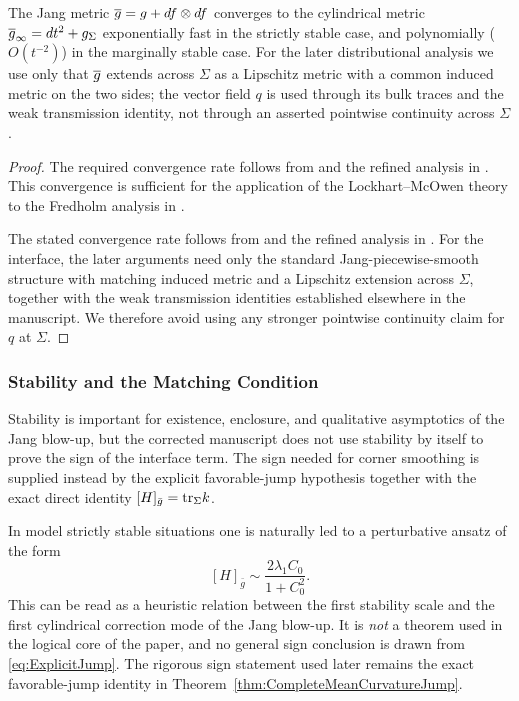 \begin{corollary}\label{cor:MetricAsymptotics}
The Jang metric $\overline{g} = g + df \otimes df$ converges to the cylindrical metric $\overline{g}_{\infty} = dt^2 + g_\Sigma$ exponentially fast in the strictly stable case, and polynomially ($O(t^{-2})$) in the marginally stable case. For the later distributional analysis we use only that $\overline{g}$ extends across $\Sigma$ as a Lipschitz metric with a common induced metric on the two sides; the vector field $q$ is used through its bulk traces and the weak transmission identity, not through an asserted pointwise continuity across $\Sigma$.
\end{corollary}
\begin{proof}
The required convergence rate follows from  and the refined analysis in . This convergence is sufficient for the application of the Lockhart--McOwen theory \cite{lockhartmccowen1985} to the Fredholm analysis in .

The stated convergence rate follows from  and the refined analysis in . For the interface, the later arguments need only the standard Jang-piecewise-smooth structure with matching induced metric and a Lipschitz extension across $\Sigma$, together with the weak transmission identities established elsewhere in the manuscript. We therefore avoid using any stronger pointwise continuity claim for $q$ at $\Sigma$.
\end{proof}

\subsubsection{Stability and the Matching Condition}
Stability is important for existence, enclosure, and qualitative asymptotics of the Jang blow-up, but the corrected manuscript does not use stability by itself to prove the sign of the interface term. The sign needed for corner smoothing is supplied instead by the explicit favorable-jump hypothesis together with the exact direct identity $[H]_{\bar g}=\mathrm{tr}_\Sigma k$.

\begin{remark}\label{lem:SpectralMeanCurvature}
In model strictly stable situations one is naturally led to a perturbative ansatz of the form
\begin{equation}\label{eq:ExplicitJump}
    [H]_{\bar g} \sim \frac{2\lambda_1 C_0}{1+C_0^2}.
\end{equation}
This can be read as a heuristic relation between the first stability scale and the first cylindrical correction mode of the Jang blow-up. It is \emph{not} a theorem used in the logical core of the paper, and no general sign conclusion is drawn from \eqref{eq:ExplicitJump}. The rigorous sign statement used later remains the exact favorable-jump identity in Theorem~\ref{thm:CompleteMeanCurvatureJump}.
\end{remark}

